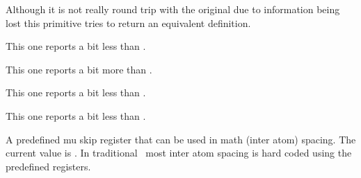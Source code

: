 \startnewprimitive[title={\prm {meaningasis}}]

Although it is not really round trip with the original due to information
being lost this primitive tries to return an equivalent definition.

\startbuffer
\tolerant\permanent\protected\gdef\foo[#1]#*[#2]{(#1)(#2)} \meaningasis\foo
\stopbuffer

\typebuffer \getbuffer \glet\foo\relax

\stopnewprimitive

\startnewprimitive[title={\prm {meaningful}}]

This one reports a bit less than .

\startbuffer
\tolerant\permanent\protected\gdef\foo[#1]#*[#2]{(#1)(#2)} \meaningful\foo
\stopbuffer

\typebuffer \getbuffer \let\gfoo\relax

\stopnewprimitive

\startnewprimitive[title={\prm {meaningfull}}]

This one reports a bit more than .

\startbuffer
\tolerant\permanent\protected\gdef\foo[#1]#*[#2]{(#1)(#2)} \meaningfull\foo
\stopbuffer

\typebuffer \getbuffer \let\gfoo\relax

\stopnewprimitive

\startnewprimitive[title={\prm {meaningles}}]

This one reports a bit less than .

\startbuffer
\tolerant\permanent\protected\gdef\foo[#1]#*[#2]{(#1)(#2)} \meaningles\foo
\stopbuffer

\typebuffer \getbuffer \let\gfoo\relax

\stopnewprimitive

\startnewprimitive[title={\prm {meaningless}}]

This one reports a bit less than .

\startbuffer
\tolerant\permanent\protected\gdef\foo[#1]#*[#2]{(#1)(#2)} \meaningless\foo
\stopbuffer

\typebuffer \getbuffer \let\gfoo\relax

\stopnewprimitive

\startoldprimitive[title={\prm {medmuskip}}]

A predefined mu skip register that can be used in math (inter atom) spacing. The
current value is {\tt \the\medmuskip}. In traditional \TEX\ most inter atom
spacing is hard coded using the predefined registers.

